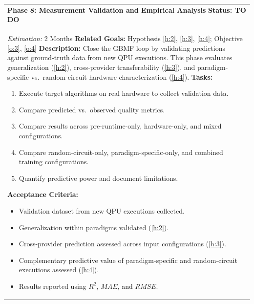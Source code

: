 \documentclass{article}
\begin{document}
\begin{longtable}{@{}p{\textwidth}@{}}
    \textbf{Phase 8: Measurement Validation and Empirical Analysis} \label{p:8} \hfill \textbf{Status: TO DO} \\
    \textit{Estimation:} 2 Months \newline
    \textbf{Related Goals:} Hypothesis \ref{h:2}, \ref{h:3}, \ref{h:4}; Objective \ref{o:3}, \ref{o:4} \newline
    \textbf{Description:} Close the GBMF loop by validating predictions against ground-truth data from new QPU executions. This phase evaluates generalization (\ref{h:2}), cross-provider transferability (\ref{h:3}), and paradigm-specific vs.\ random-circuit hardware characterization (\ref{h:4}). \newline
    \textbf{Tasks:}
    \begin{enumerate}[label=T8.\arabic*, ref=T8.\arabic*, font=\bfseries, leftmargin=3.5em, labelindent=0pt, itemindent=0pt, labelsep=0.5em, noitemsep, topsep=0pt]
        \item \label{p8:t1} Execute target algorithms on real hardware to collect validation data.
        \item \label{p8:t2} Compare predicted vs.\ observed quality metrics.
        \item \label{p8:t3} Compare results across pre-runtime-only, hardware-only, and mixed configurations.
        \item \label{p8:t4} Compare random-circuit-only, paradigm-specific-only, and combined training configurations.
        \item \label{p8:t5} Quantify predictive power and document limitations.
    \end{enumerate}
    \textbf{Acceptance Criteria:}
    \begin{itemize}[leftmargin=1.5em, labelindent=0pt, itemindent=0pt, noitemsep, topsep=0pt]
        \item Validation dataset from new QPU executions collected.
        \item Generalization within paradigms validated (\ref{h:2}).
        \item Cross-provider prediction assessed across input configurations (\ref{h:3}).
        \item Complementary predictive value of paradigm-specific and random-circuit executions assessed (\ref{h:4}).
        \item Results reported using $R^2$, $MAE$, and $RMSE$.
    \end{itemize} \\
    \midrule
    

\end{longtable}
\end{document}
